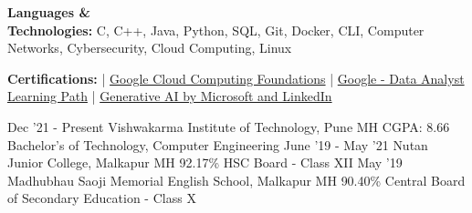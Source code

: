 \documentclass[9pt]{developercv} %
\begin{document}
\vspace{4 pt}
\begin{entrylist}
    \vspace{-8 pt}
    \entry
		{\textbf{Languages \& \\ Technologies:}}
		{\normalfont C, C++, Java, Python, SQL,  Git, Docker, CLI, Computer Networks, Cybersecurity, Cloud Computing, Linux}
        {}
        {}
    \vspace{-14 pt}
    
    \entry
        {\textbf{Certifications:}}
		{ | {\href{https://www.cloudskillsboost.google/public_profiles/b5e81354-7f62-4d99-bc49-5a5c9fb8cde7}{Google Cloud Computing Foundations}} | {\href{https://www.cloudskillsboost.google/public_profiles/b5e81354-7f62-4d99-bc49-5a5c9fb8cde7}{Google - Data Analyst Learning Path}} | {\href{https://www.linkedin.com/learning/certificates/2e99cc9b1c4560ce3a15dbea1db820ba0c666f3eb4c444f0aa6e342ff1dc4fa2}{Generative AI by Microsoft and LinkedIn}}}
		{}
		{}
\end{entrylist}

\vspace{-14 pt}
\vspace{-4 pt}
\begin{entrylist}
    \vspace{-6 pt}
    \entry
		{Dec '21 - Present}
		{Vishwakarma Institute of Technology, Pune MH}
		{CGPA: 8.66}
		{Bachelor's of Technology, Computer Engineering}
    \vspace{-3 pt}
    \entry
		{June '19 - May '21}
		{Nutan Junior College, Malkapur MH}
		{92.17\%}
		{HSC Board - Class XII}
    \entry
            {May '19}
		{Madhubhau Saoji Memorial English School, Malkapur MH}
		{90.40\%}
		{Central Board of Secondary Education - Class X}
\end{entrylist}
\end{document}
